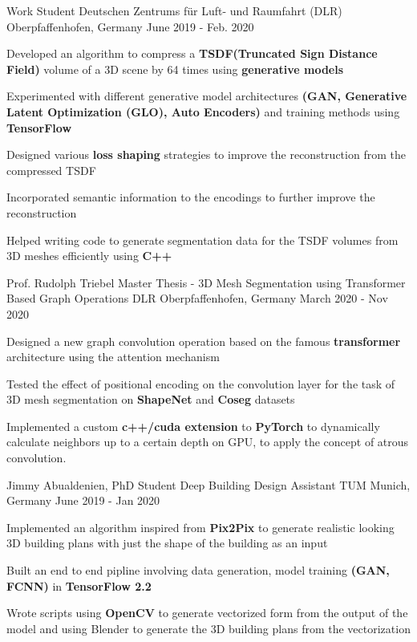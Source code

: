 \begin{cventries}
  \cventry
  {Work Student} %
  {Deutschen Zentrums für Luft- und Raumfahrt (DLR)} %
  {Oberpfaffenhofen, Germany} %
  {June 2019 - Feb. 2020} %
  {
  \begin{cvitems} %
    \item {Developed an algorithm to compress a \textbf{TSDF(Truncated Sign
    Distance Field)} volume of a 3D scene by 64 times using
    \textbf{generative models}}
    \item {Experimented with different generative model architectures
    \textbf{(GAN, Generative Latent Optimization (GLO), Auto Encoders)} and
    training methods using \textbf{TensorFlow}}
    \item {Designed various \textbf{loss shaping} strategies to improve the
    reconstruction from the compressed TSDF}
    \item {Incorporated semantic information to the encodings to further improve the reconstruction}
    \item {Helped writing code to generate segmentation data for the TSDF
    volumes from 3D meshes efficiently using \textbf{C++}}
  \end{cvitems}
  }
  \cventry
  {Prof. Rudolph Triebel} %
  {Master Thesis - 3D Mesh Segmentation using Transformer Based Graph Operations} %
  {DLR Oberpfaffenhofen, Germany} %
  {March 2020 - Nov 2020} %
  {
  \begin{cvitems} %
    \item {Designed a new graph convolution operation based on the famous
    \textbf{transformer} architecture using the attention mechanism}
    \item {Tested the effect of positional encoding on the convolution layer for
    the task of 3D mesh segmentation on \textbf{ShapeNet} and \textbf{Coseg} datasets}
    \item {Implemented a custom \textbf{c++/cuda extension} to \textbf{PyTorch}
    to dynamically calculate neighbors up to a certain depth on GPU, to apply the
    concept of atrous convolution.}
  \end{cvitems}
  }
	\cventry
	{Jimmy Abualdenien, PhD Student} %
	{Deep Building Design Assistant} %
	{TUM Munich, Germany} %
	{June 2019 - Jan 2020} %
	{
		\begin{cvitems} %
			\item {Implemented an algorithm inspired from \textbf{Pix2Pix} to generate realistic looking 3D building plans with just the shape of the building as an input}
			\item {Built an end to end pipline involving data generation, model training \textbf{(GAN, FCNN)} in \textbf{TensorFlow 2.2}}
			\item {Wrote scripts using \textbf{OpenCV} to generate vectorized form from the output of the model and using Blender to generate the 3D building plans from the vectorization}
		\end{cvitems}
	}
\end{cventries}
